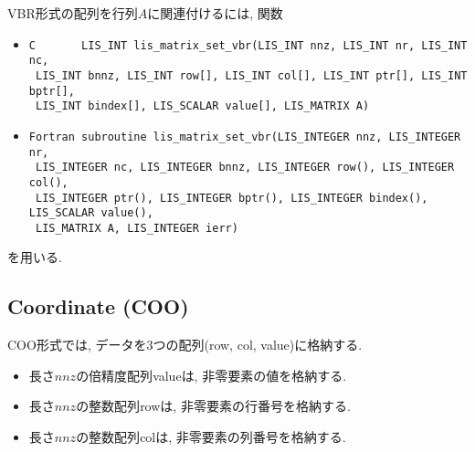 \documentclass[a4paper]{jarticle}
\begin{document}
{{VBR形式の配列を行列$A$に関連付けるには, 関数
\begin{itemize}
\item \verb|C       LIS_INT lis_matrix_set_vbr(LIS_INT nnz, LIS_INT nr, LIS_INT nc,|\\
      \verb| LIS_INT bnnz, LIS_INT row[], LIS_INT col[], LIS_INT ptr[], LIS_INT bptr[],|\\ 
      \verb| LIS_INT bindex[], LIS_SCALAR value[], LIS_MATRIX A)|
\item \verb|Fortran subroutine lis_matrix_set_vbr(LIS_INTEGER nnz, LIS_INTEGER nr,|\\
      \verb| LIS_INTEGER nc, LIS_INTEGER bnnz, LIS_INTEGER row(), LIS_INTEGER col(),|\\ 
      \verb| LIS_INTEGER ptr(), LIS_INTEGER bptr(), LIS_INTEGER bindex(), LIS_SCALAR value(),|\\
      \verb| LIS_MATRIX A, LIS_INTEGER ierr)|
\end{itemize}
を用いる. 

\newpage
\subsection{Coordinate (COO)}
COO形式では, データを3つの配列({\ttfamily row, col, value})に格納する. 
\begin{itemize}
\item 長さ$nnz$の倍精度配列{\ttfamily value}は, 非零要素の値を格納する. 
\item 長さ$nnz$の整数配列{\ttfamily row}は, 非零要素の行番号を格納する. 
\item 長さ$nnz$の整数配列{\ttfamily col}は, 非零要素の列番号を格納する. 
\end{itemize}

}}
\end{document}
